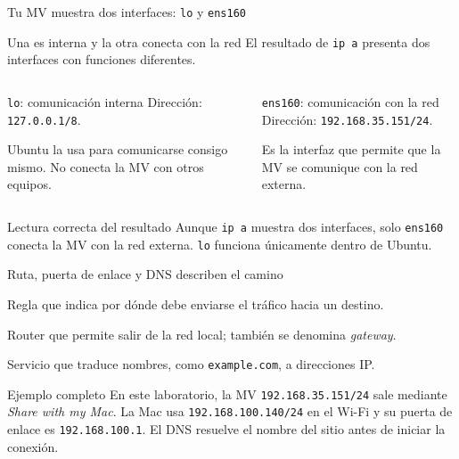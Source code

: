 \documentclass[aspectratio=169,10pt,c]{beamer}
\begin{document}
\begin{frame}{Tu MV muestra dos interfaces: \texttt{lo} y \texttt{ens160}}
\begin{block}{Una es interna y la otra conecta con la red}
\small El resultado de \texttt{ip a} presenta dos interfaces con funciones diferentes.
\end{block}
\begin{columns}[T,onlytextwidth]
\begin{exampleblock}{\texttt{lo}: comunicación interna}
\small
Dirección: \texttt{127.0.0.1/8}.\par
Ubuntu la usa para comunicarse consigo mismo. No conecta la MV con otros equipos.
\end{exampleblock}
\begin{exampleblock}{\texttt{ens160}: comunicación con la red}
\small
Dirección: \texttt{192.168.35.151/24}.\par
Es la interfaz que permite que la MV se comunique con la red externa.
\end{exampleblock}
\end{columns}
\begin{alertblock}{Lectura correcta del resultado}
\small Aunque \texttt{ip a} muestra dos interfaces, solo \texttt{ens160} conecta la MV con la red externa. \texttt{lo} funciona únicamente dentro de Ubuntu.
\end{alertblock}
\end{frame}

\begin{frame}{Ruta, puerta de enlace y DNS describen el camino}
\begin{description}\small
  \item[Ruta] Regla que indica por dónde debe enviarse el tráfico hacia un destino.
  \item[Puerta de enlace] Router que permite salir de la red local; también se denomina \emph{gateway}.
  \item[DNS] Servicio que traduce nombres, como \texttt{example.com}, a direcciones IP.
\end{description}
\begin{exampleblock}{Ejemplo completo}
\small En este laboratorio, la MV \texttt{192.168.35.151/24} sale mediante \emph{Share with my Mac}. La Mac usa \texttt{192.168.100.140/24} en el Wi-Fi y su puerta de enlace es \texttt{192.168.100.1}. El DNS resuelve el nombre del sitio antes de iniciar la conexión.
\end{exampleblock}
\end{frame}
\end{document}
